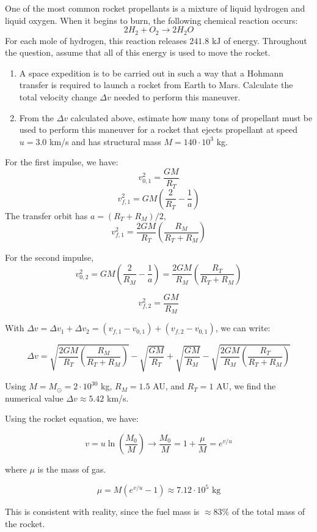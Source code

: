 \documentclass[11pt]{article}
\begin{document}
\begin{pproblem} One of the most common rocket propellants is a mixture of liquid hydrogen and liquid oxygen. When it begins to burn, the following chemical reaction occurs:
    \[
    2H_2 + O_2 \rightarrow 2H_2O
    \] 
    For each mole of hydrogen, this reaction releases \(241.8 \text{ kJ}\) of energy. Throughout the question, assume that all of this energy is used to move the rocket.
    \begin{enumerate}[label=\textbf{\alph*)}]
        \item A space expedition is to be carried out in such a way that a Hohmann transfer is required to launch a rocket from Earth to Mars. Calculate the total velocity change \(\Delta v\) needed to perform this maneuver.
        \item From the \(\Delta v\) calculated above, estimate how many tons of propellant must be used to perform this maneuver for a rocket that ejects propellant at speed \(u = 3.0\) km/s and has structural mass \(M = 140\cdot10^3\) kg.
    \end{enumerate}
    \begin{pssolution*}{}{}
        \begin{alternativas}
            \item For the first impulse, we have:
            \[v_{0,1}^2=\frac{GM}{R_T}\]
            \[v_{f,1}^2 = GM\left(\frac{2}{R_T}-\frac{1}{a}\right)\]
            The transfer orbit has \(a=(R_T+R_M)/2\),
            \[v_{f,1}^2 = \frac{2GM}{R_T}\left(\frac{R_M}{R_T+R_M}\right)\]

            For the second impulse,
            \[v_{0,2}^2 = GM\left(\frac{2}{R_M}-\frac{1}{a}\right) = \frac{2GM}{R_M}\left(\frac{R_T}{R_T+R_M}\right)\]

            \[v_{f,2}^2 = \frac{GM}{R_M}\]

            With \(\Delta v = \Delta v_1 + \Delta v_2 = (v_{f,1}-v_{0,1})+(v_{f,2}-v_{0,1})\), we can write:

            \[\boxed{\Delta v = \sqrt{\frac{2GM}{R_T}\left(\frac{R_M}{R_T+R_M}\right)}-\sqrt{\frac{GM}{R_T}} + \sqrt{\frac{GM}{R_M}} - \sqrt{\frac{2GM}{R_M}\left(\frac{R_T}{R_T+R_M}\right)}}\]
            
            Using \(M = M_\odot = 2\cdot10^{30}\) kg, \(R_M = 1.5\) AU, and \(R_T = 1\) AU, we find the numerical value \(\Delta v \approx 5.42 \) km/s.

            \item Using the rocket equation, we have:
            
            \[v = u\ln\left(\frac{M_0}{M}\right) \rightarrow \frac{M_0}{M}  = 1+ \frac{\mu}{M}= e^{v/u}\]

            where \(\mu\) is the mass of gas.

            \[\boxed{\mu = M(e^{v/u}-1) \approx 7.12 \cdot 10^5 \text{ kg}}\]

            This is consistent with reality, since the fuel mass is \(\approx 83\%\) of the total mass of the rocket.
        \end{alternativas}
    \end{pssolution*}
\end{pproblem}
\end{document}
